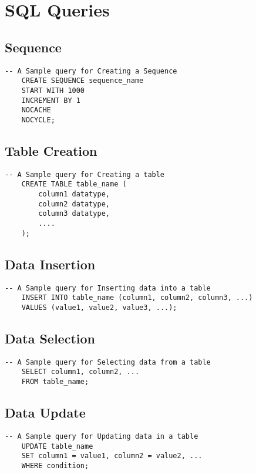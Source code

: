 \chapter{SQL Queries}
\hrulefill

\section{Sequence}
\begin{lstlisting}[caption={Sample Sequence}, label={lst:s1}]
    -- A Sample query for Creating a Sequence
    CREATE SEQUENCE sequence_name
    START WITH 1000
    INCREMENT BY 1
    NOCACHE
    NOCYCLE;

    \end{lstlisting}

\section{Table Creation}
\begin{lstlisting}[caption={Sample one Table}, label={lst:c1}]
    -- A Sample query for Creating a table
    CREATE TABLE table_name (
        column1 datatype,
        column2 datatype,
        column3 datatype,
        ....
    );
    \end{lstlisting}

\section{Data Insertion}
\begin{lstlisting}[caption={Sample one Table}, label={lst:i1}]
    -- A Sample query for Inserting data into a table
    INSERT INTO table_name (column1, column2, column3, ...)
    VALUES (value1, value2, value3, ...);
    \end{lstlisting}

\section{Data Selection}
\begin{lstlisting}[caption={Sample one Table}, label={lst:s2}]
    -- A Sample query for Selecting data from a table
    SELECT column1, column2, ...
    FROM table_name;
    \end{lstlisting}

\section{Data Update}
\begin{lstlisting}[caption={Sample one Table}, label={lst:u1}]
    -- A Sample query for Updating data in a table
    UPDATE table_name
    SET column1 = value1, column2 = value2, ...
    WHERE condition;
    \end{lstlisting}

